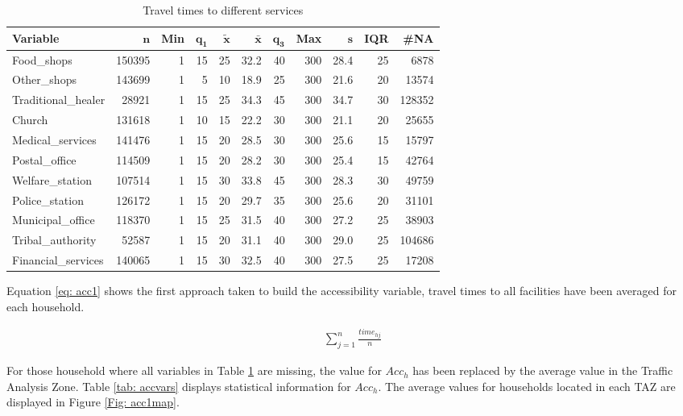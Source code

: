 \documentclass[]{article}
\begin{document}
\begin{table}[ht]
\centering
{\footnotesize
\begin{tabular}{lrrrrrrrrrr}
 \textbf{Variable} & $\mathbf{n}$ & \textbf{Min} & $\mathbf{q_1}$ & $\mathbf{\widetilde{x}}$ & $\mathbf{\bar{x}}$ & $\mathbf{q_3}$ & \textbf{Max} & $\mathbf{s}$ & \textbf{IQR} & \textbf{\#NA} \\ 
  \hline
Food\_shops & 150395 & 1 & 15 & 25 & 32.2 & 40 & 300 & 28.4 & 25 &   6878 \\ 
  Other\_shops & 143699 & 1 &  5 & 10 & 18.9 & 25 & 300 & 21.6 & 20 &  13574 \\ 
  Traditional\_healer &  28921 & 1 & 15 & 25 & 34.3 & 45 & 300 & 34.7 & 30 & 128352 \\ 
  Church & 131618 & 1 & 10 & 15 & 22.2 & 30 & 300 & 21.1 & 20 &  25655 \\ 
  Medical\_services & 141476 & 1 & 15 & 20 & 28.5 & 30 & 300 & 25.6 & 15 &  15797 \\ 
  Postal\_office & 114509 & 1 & 15 & 20 & 28.2 & 30 & 300 & 25.4 & 15 &  42764 \\ 
  Welfare\_station & 107514 & 1 & 15 & 30 & 33.8 & 45 & 300 & 28.3 & 30 &  49759 \\ 
  Police\_station & 126172 & 1 & 15 & 20 & 29.7 & 35 & 300 & 25.6 & 20 &  31101 \\ 
  Municipal\_office & 118370 & 1 & 15 & 25 & 31.5 & 40 & 300 & 27.2 & 25 &  38903 \\ 
  Tribal\_authority &  52587 & 1 & 15 & 20 & 31.1 & 40 & 300 & 29.0 & 25 & 104686 \\ 
  Financial\_services & 140065 & 1 & 15 & 30 & 32.5 & 40 & 300 & 27.5 & 25 &  17208 \\ 
  \end{tabular}
}
\caption{Travel times to different services} 
\label{tab: timevars}
\end{table}

Equation \ref{eq: acc1} shows the first approach taken to build the
accessibility variable, travel times to all facilities have been
averaged for each household.

\begin{eqnarray}
\sum_{j=1}^{n}\frac{time_{hj}}{n}
\label{eq: acc1}
\end{eqnarray}

For those household where all variables in Table \ref{tab: timevars} are
missing, the value for \(Acc_{h}\) has been replaced by the average
value in the Traffic Analysis Zone. Table \ref{tab: accvars} displays
statistical information for \(Acc_{h}\). The average values for
households located in each TAZ are displayed in Figure
\ref{Fig: acc1map}.
\end{document}
